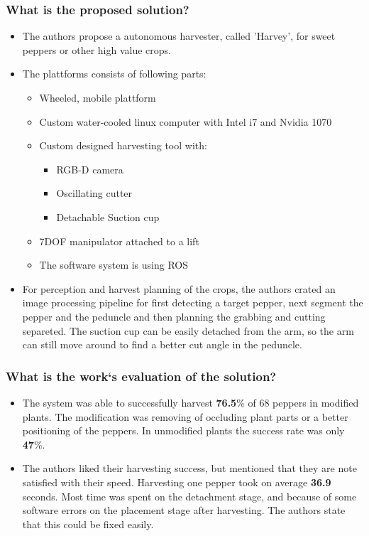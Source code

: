 \documentclass{article}
\begin{document}
\subsubsection*{What is the proposed solution?}
\begin{itemize}
    \item The authors propose a autonomous harvester, called 'Harvey', for sweet peppers or other high value crops.
    \item The plattforms consists of following parts: \ \begin{itemize}
        \item Wheeled, mobile plattform
        \item Custom water-cooled linux computer with Intel i7 and Nvidia 1070
        \item Custom designed harvesting tool with: \ \begin{itemize}
            \item RGB-D camera
            \item Oscillating cutter
            \item Detachable Suction cup
        \end{itemize}
        \item 7DOF manipulator attached to a lift
        \item The software system is using ROS 
    \end{itemize} 
    \item For perception and harvest planning of the crops, the authors crated an image processing pipeline for first detecting a target pepper, next segment the pepper and the peduncle and then planning the grabbing and cutting separeted. The suction cup can be easily detached from the arm, so the arm can still move around to find a better cut angle in the peduncle.
\end{itemize}
\subsubsection*{What is the work`s evaluation of the solution?}
\begin{itemize}
    \item The system was able to successfully harvest \textbf{76.5}\% of 68 peppers in modified plants. The modification was removing of occluding plant parts or a better positioning of the peppers. In unmodified plants the success rate was only \textbf{47}\%.
    \item The authors liked their harvesting success, but mentioned that they are note satisfied with their speed. Harvesting one pepper took on average \textbf{36.9} seconds. Most time was spent on the detachment stage, and because of some software errors on the placement stage after harvesting. The authors state that this could be fixed easily.
\end{itemize}
\end{document}
